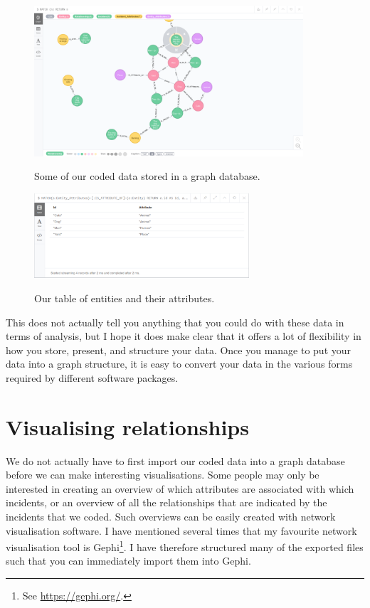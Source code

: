 \documentclass{memoir}
\begin{document}
\begin{figure}[h!]
  \centering
  \caption{Some of our coded data stored in a graph database.}
  \includegraphics[width=100mm]{Screenshot_23.pdf}
  \label{fig:graphdatabaseexample}
\end{figure}

\begin{figure}[h!]
  \centering
  \caption{Our table of entities and their attributes.}
  \includegraphics[width=80mm]{Screenshot_24.pdf}
  \label{fig:attributestable}
\end{figure}

This does not actually tell you anything that you could do with these data in terms of analysis, but I hope it does make clear that it offers a lot of flexibility in how you store, present, and structure your data. Once you manage to put your data into a graph structure, it is easy to convert your data in the various forms required by different software packages.

\section{Visualising relationships}
\label{sec:visualisingrelationships}

We do not actually have to first import our coded data into a graph database before we can make interesting visualisations. Some people may only be interested in creating an overview of which attributes are associated with which incidents, or an overview of all the relationships that are indicated by the incidents that we coded. Such overviews can be easily created with network visualisation software. I have mentioned several times that my favourite network visualisation tool is Gephi\footnote{See \url{https://gephi.org/}.}. I have therefore structured many of the exported files such that you can immediately import them into Gephi.
\end{document}
